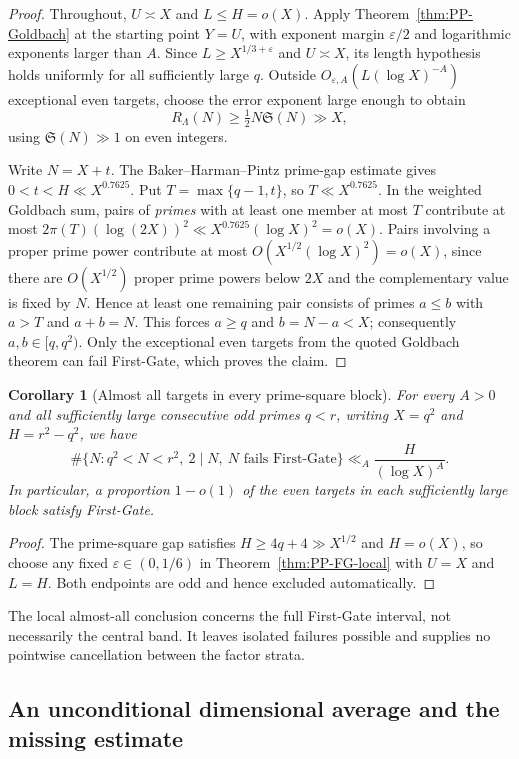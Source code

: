 \documentclass[final,11pt]{elsarticle}
\newtheorem{corollary}[theorem]{Corollary}
\theoremstyle{definition}
\theoremstyle{remark}
\newcommand{\Sg}{\mathfrak{S}}
\newcommand{\eps}{\varepsilon}
\numberwithin{equation}{section}
\begin{document}
\begin{proof}
Throughout, $U\asymp X$ and $L\le H=o(X)$. Apply
Theorem~\ref{thm:PP-Goldbach} at the starting point $Y=U$,
with exponent margin $\eps/2$ and logarithmic exponents larger
than $A$. Since $L\ge X^{1/3+\eps}$ and $U\asymp X$, its length
hypothesis holds uniformly for all sufficiently large $q$.
Outside $O_{\eps,A}(L(\log X)^{-A})$ exceptional even targets,
choose the error exponent large enough to obtain
\[
R_\Lambda(N)\ge\tfrac12N\Sg(N)\gg X,
\]
using $\Sg(N)\gg1$ on even integers.

Write $N=X+t$. The Baker--Harman--Pintz prime-gap estimate gives
$0<t<H\ll X^{0.7625}$. Put $T=\max\{q-1,t\}$, so
$T\ll X^{0.7625}$. In the weighted Goldbach sum, pairs of
\emph{primes} with at least one member at most $T$ contribute
at most $2\pi(T)(\log(2X))^2\ll X^{0.7625}(\log X)^2=o(X)$.
Pairs involving a proper prime power contribute at most
$O(X^{1/2}(\log X)^2)=o(X)$, since there are $O(X^{1/2})$
proper prime powers below $2X$ and the complementary value is
fixed by $N$. Hence at least one remaining pair consists of
primes $a\le b$ with $a>T$ and $a+b=N$. This forces
$a\ge q$ and $b=N-a<X$; consequently $a,b\in[q,q^2)$.
Only the exceptional even targets from the quoted Goldbach theorem
can fail First-Gate, which proves the claim.
\end{proof}

\begin{corollary}[Almost all targets in every prime-square block]
\label{cor:PP-FG-block}
For every $A>0$ and all sufficiently large consecutive odd primes
$q<r$, writing $X=q^2$ and $H=r^2-q^2$, we have
\[
\boxed{\#\{N:q^2<N<r^2,\ 2\mid N,\ N\text{ fails First-Gate}\}
\ll_A\frac{H}{(\log X)^A}.}
\]
In particular, a proportion $1-o(1)$ of the even targets in
\emph{each} sufficiently large block satisfy First-Gate.
\end{corollary}
\begin{proof}
The prime-square gap satisfies $H\ge4q+4\gg X^{1/2}$ and
$H=o(X)$, so choose any fixed $\eps\in(0,1/6)$ in
Theorem~\ref{thm:PP-FG-local} with $U=X$ and $L=H$.
Both endpoints are odd and hence excluded automatically.
\end{proof}

The local almost-all conclusion concerns the full First-Gate interval,
not necessarily the central band. It leaves isolated failures possible
and supplies no pointwise cancellation between the factor strata.

\subsection{An unconditional dimensional average and the missing estimate}
\label{subsec:dimensional-average}
\end{document}
